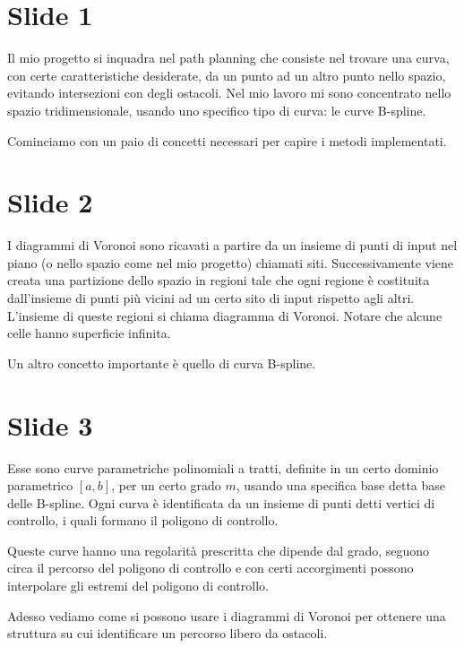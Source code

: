 \documentclass{article}
\begin{document}
\section*{Slide 1}
Il mio progetto si inquadra nel path planning che consiste nel trovare
una curva, con certe caratteristiche desiderate, da un punto ad un
altro punto nello spazio, evitando intersezioni con degli
ostacoli. Nel mio lavoro mi sono concentrato nello spazio
tridimensionale, usando uno specifico tipo di curva: le curve B-spline.

Cominciamo con un paio di concetti necessari per capire i metodi
implementati.

\section*{Slide 2}
I diagrammi di Voronoi sono ricavati a partire da un insieme di punti
di input
nel piano (o nello spazio come nel mio progetto) chiamati
siti. Successivamente viene
creata una partizione dello spazio in regioni tale che ogni regione è
costituita dall'insieme di punti più vicini ad un certo sito di input
rispetto agli altri. L'insieme di queste regioni si chiama diagramma
di Voronoi. Notare che alcune celle hanno superficie infinita.

Un altro concetto importante è quello di curva B-spline.

\section*{Slide 3}
Esse sono curve parametriche polinomiali a tratti, definite in un
certo dominio parametrico $[a,b]$, per un certo grado $m$, usando una
specifica base detta base delle B-spline. Ogni curva è identificata da
un insieme di punti detti vertici di controllo, i quali formano il
poligono di controllo.

Queste curve hanno una regolarità prescritta che dipende dal grado,
seguono circa il percorso del poligono di controllo e con certi
accorgimenti possono interpolare gli estremi del poligono di controllo.

Adesso vediamo come si possono usare i diagrammi di Voronoi per
ottenere una struttura su cui identificare un percorso libero da
ostacoli.
\end{document}
